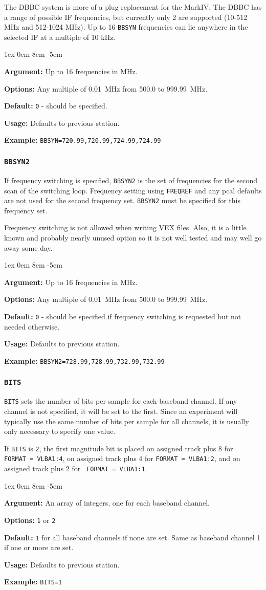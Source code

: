 \documentclass{report}
\newcommand{\rcwbox}[5]{
  \begin{list}{}{\parsep 1ex  \itemsep 0em
                 \leftmargin 8em  \itemindent -5em }
    \item {\bf Argument:} #1
    \item {\bf Options:}  #2
    \item {\bf Default:}  #3
    \item {\bf Usage:}    #4
    \item {\bf Example:}  #5
  \end{list}
}
\begin{document}
The DBBC system is more of a plug replacement for the MarkIV. The DBBC
has a range of possible IF frequencies, but currently only 2 are
supported (10-512 MHz and 512-1024 MHz). Up to 16 {\tt BBSYN} frequencies
can lie anywhere in the selected IF at a multiple of 10 kHz.

\rcwbox
{Up to 16 frequencies in MHz.}
{Any multiple of 0.01~MHz from 500.0 to 999.99~MHz.}
{{\tt 0} - should be specified.}
{Defaults to previous station.}
{{\tt BBSYN=720.99,720.99,724.99,724.99}}


\subsubsection{\label{SP:BBSYN2}{\tt BBSYN2}}

If frequency switching is specified, {\tt BBSYN2} is the
set of frequencies for the second scan of the switching loop.
Frequency setting using {\tt FREQREF} and any pcal defaults are not
used for the second frequency set. {\tt BBSYN2} must be specified for
this frequency set.

Frequency switching is not allowed when writing VEX files.  Also, it
is a little known and probably nearly unused option so it is not
well tested and may well go away some day.

\rcwbox
{Up to 16 frequencies in MHz.}
{Any multiple of 0.01~MHz from 500.0 to 999.99~MHz.}
{{\tt 0} - should be specified if frequency switching is requested
but not needed otherwise.}
{Defaults to previous station.}
{{\tt BBSYN2=728.99,728.99,732.99,732.99}}


\subsubsection{\label{SP:BITS}{\tt BITS}}

{\tt BITS} sets the number of bits per sample for each baseband channel.
If any channel is not specified, it will be set to the first.  Since
an experiment will typically use the same number of bits per sample
for all channels, it is usually only necessary to specify one value.

If {\tt BITS} is {\tt 2}, the first magnitude bit is placed on assigned
track plus 8 for {\tt FORMAT~= VLBA1:4}, on assigned track plus 4 for
{\tt FORMAT~= VLBA1:2}, and on assigned track plus 2 for {\tt
FORMAT~= VLBA1:1}.

\rcwbox
{An array of integers, one for each baseband channel.}
{{\tt 1} or {\tt 2}}
{{\tt 1} for all baseband channels if none are set. Same as baseband
channel 1 if one or more are set.}
{Defaults to previous station.}
{{\tt BITS=1}}
\end{document}
